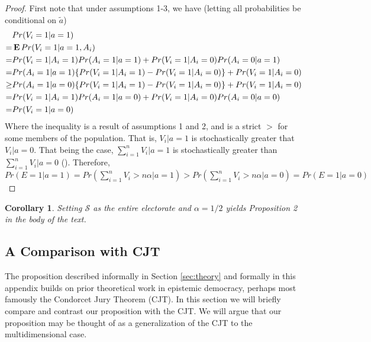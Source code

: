 \documentclass[11pt]{article}
\newcommand{\E}{\mathop{\bf E\/}}
\newtheorem{cor}{Corollary}
\begin{document}
\begin{proof}
First note that
under assumptions 1-3, we have (letting all probabilities be conditional on $\tilde{a}$)
\begin{align*}
&Pr(V_i=1|a=1)\\
=&\E Pr(V_i=1|a=1,A_i)\\
=&Pr(V_i=1|A_i=1)Pr(A_i=1|a=1)+Pr(V_i=1|A_i=0)Pr(A_i=0|a=1)\\
=&Pr(A_i=1|a=1)\{Pr(V_i=1|A_i=1)-Pr(V_i=1|A_i=0)\}+Pr(V_i=1|A_i=0)\\
\ge&Pr(A_i=1|a=0)\{Pr(V_i=1|A_i=1)-Pr(V_i=1|A_i=0)\}+Pr(V_i=1|A_i=0)\\
=&Pr(V_i=1|A_i=1)Pr(A_i=1|a=0)+Pr(V_i=1|A_i=0)Pr(A_i=0|a=0)\\
=&Pr(V_i=1|a=0)
\end{align*}
Where the inequality is a result of assumptions 1 and 2, and is a strict $>$ for some members of the population.
That is, $V_i|a=1$ is stochastically greater that $V_i|a=0$. That being the case, $\sum_{i=1}^n V_i |a=1$ is stochastically greater than $\sum_{i=1}^n V_i |a=0$ (\citet{shaked2007stochastic}).
Therefore, $Pr(E=1|a=1)=Pr(\sum_{i=1}^n V_i >n\alpha|a=1)>Pr(\sum_{i=1}^n V_i>n\alpha |a=0)=Pr(E=1|a=0)$
\end{proof}

\begin{cor}
Setting $\mathcal{S}$ as the entire electorate and $\alpha=1/2$
yields Proposition 2 in the body of the text. 
\end{cor}

\subsection{A Comparison with CJT}\label{sec:cjt-compare}

The proposition described informally in Section \ref{sec:theory} and formally in this appendix builds on prior theoretical work in epistemic democracy, perhaps most famously the Condorcet Jury Theorem (CJT).
In this section we will briefly compare and contrast our proposition with the CJT.
We will argue that our proposition may be thought of as a generalization of the CJT to the multidimensional case.
\end{document}
